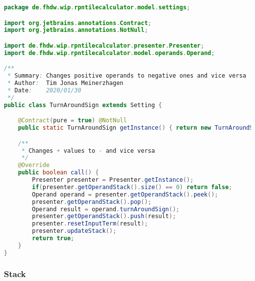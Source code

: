\begin{lstlisting}[caption=TurnAroundSign (Meinerzhagen),label=list:TurnAroundSign,language=Java]
package de.fhdw.wip.rpntilecalculator.model.settings;

import org.jetbrains.annotations.Contract;
import org.jetbrains.annotations.NotNull;

import de.fhdw.wip.rpntilecalculator.presenter.Presenter;
import de.fhdw.wip.rpntilecalculator.model.operands.Operand;

/**
 * Summary: Changes positive operands to negative ones and vice versa
 * Author:  Tim Jonas Meinerzhagen
 * Date:    2020/01/30
 */
public class TurnAroundSign extends Setting {

    @Contract(pure = true) @NotNull
    public static TurnAroundSign getInstance() { return new TurnAroundSign(); }

    /**
     * Changes + values to - and vice versa
     */
    @Override
    public boolean call() {
        Presenter presenter = Presenter.getInstance();
        if(presenter.getOperandStack().size() == 0) return false;
        Operand operand = presenter.getOperandStack().peek();
        presenter.getOperandStack().pop();
        Operand result = operand.turnAroundSign();
        presenter.getOperandStack().push(result);
        presenter.resetInputTerm(result);
        presenter.updateStack();
        return true;
    }
}
\end{lstlisting} 

\subsubsection{Stack}   

